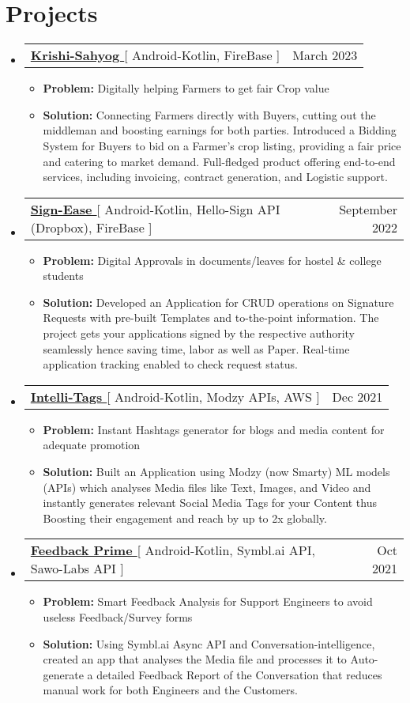 \documentclass[letterpaper,11pt]{article}
\makeatletter
\newcommand{\resumeItem}[1]{
  \item\small{
    {#1 \vspace{-2pt}}
  }
}
\newcommand{\resumeProjectHeading}[2]{
    \item
    \begin{tabular*}{0.97\textwidth}{l@{\extracolsep{\fill}}r}
      \small#1 & #2 \\
    \end{tabular*}\vspace{-7pt}
}
\newcommand{\resumeSubHeadingListStart}{\begin{itemize}[leftmargin=0.15in, label={}]}
\newcommand{\resumeSubHeadingListEnd}{\end{itemize}}
\newcommand{\resumeItemListStart}{\begin{itemize}}
\newcommand{\resumeItemListEnd}{\end{itemize}\vspace{-5pt}}
\makeatother
\begin{document}
\section{\newline \textbf{Projects}}
\resumeSubHeadingListStart
      \resumeProjectHeading
          {\textbf{\href{https://github.com/aniketk13/FarmApp}{Krishi-Sahyog }}{[ Android-Kotlin, FireBase ]}}{March 2023}
          \resumeItemListStart
          \resumeItem{\textbf{Problem:} Digitally helping Farmers to get fair Crop value}
          \resumeItem{\textbf{Solution:} Connecting Farmers directly with Buyers, cutting out the middleman and boosting earnings for both parties. Introduced a Bidding System for Buyers to bid on a Farmer's crop listing, providing a fair price and catering to market demand. Full-fledged product offering end-to-end services, including invoicing, contract generation, and Logistic support.}
          \resumeItemListEnd
    \resumeSubHeadingListEnd
 \resumeSubHeadingListStart
      \resumeProjectHeading
          {\textbf{\href{https://github.com/itsnitish22/Sign-Ease}{Sign-Ease }}{[ Android-Kotlin, Hello-Sign API (Dropbox), FireBase ]}}{September 2022}
          \resumeItemListStart
          \resumeItem{\textbf{Problem:} Digital Approvals in documents/leaves for hostel \& college students}
          \resumeItem{\textbf{Solution:} Developed an Application for CRUD operations on Signature Requests with pre-built Templates and to-the-point information. The project gets your applications signed by the respective authority seamlessly hence saving time, labor as well as Paper. Real-time application tracking enabled to check request status.}
          \resumeItemListEnd
    \resumeSubHeadingListEnd
    
 \resumeSubHeadingListStart
      \resumeProjectHeading
          {\textbf{\href{https://github.com/aniketk13/Intelli-Tags}{Intelli-Tags }}{[ Android-Kotlin, Modzy APIs, AWS ]}}{Dec 2021}
          \resumeItemListStart
          \resumeItem{\textbf{Problem:} Instant Hashtags generator for blogs and media content for adequate promotion}
          \resumeItem{\textbf{Solution:} Built an Application using Modzy (now Smarty) ML models (APIs) which analyses Media files like Text, Images, and Video and instantly generates relevant Social Media Tags for your Content thus Boosting their engagement and reach by up to 2x globally.}
          \resumeItemListEnd
    \resumeSubHeadingListEnd
    
    \resumeSubHeadingListStart
      \resumeProjectHeading
          {\textbf{\href{https://github.com/aniketk13/Feedback-Prime}{Feedback Prime }}{[ Android-Kotlin, Symbl.ai API, Sawo-Labs API ]}}{Oct 2021}
          \resumeItemListStart
           \resumeItem{\textbf{Problem:} Smart Feedback Analysis for Support Engineers to avoid useless Feedback/Survey forms}
           \resumeItem{\textbf{Solution:} Using Symbl.ai Async API and Conversation-intelligence, created an app that analyses the Media file and processes it to Auto-generate a detailed Feedback Report of the Conversation that reduces manual work for both Engineers and the Customers.} \newline
          \resumeItemListEnd
    \resumeSubHeadingListEnd
\end{document}
